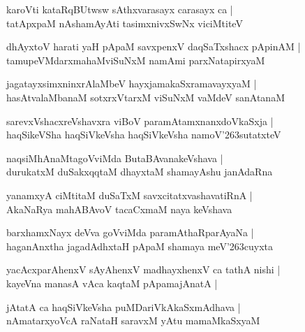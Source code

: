 \documentclass[twoside,12pt,openright]{book}
\def\S{\char'263}
\newcounter{shloka}[chapter]
\begin{document}
\begin{shloka}%
karoVti kataRqBUtwsw sAthxvarasayx carasayx ca |\\
tatApxpaM nAshamAyAti tasimxnivxSwNx viciMtiteV 
\end{shloka}

\begin{shloka}%
dhAyxtoV harati yaH pApaM savxpenxV daqSaTxshacx pApinAM |\\
tamupeVMdarxmahaMviSuNxM namAmi parxNatapirxyaM 
\end{shloka}

\begin{shloka}%
jagatayxsimxninxrAlaMbeV hayxjamakaSxramavayxyaM |\\
hasAtvalaMbanaM sotxrxVtarxM viSuNxM vaMdeV sanAtanaM 
\end{shloka}

\begin{shloka}%
sarevxVshacxreVshavxra viBoV paramAtamxnanxdoVkaSxja |\\
haqSikeVSha haqSiVkeVsha haqSiVkeVsha namoV\S sutatxteV 
\end{shloka}

\begin{shloka}%
naqsiMhAnaMtagoVviMda ButaBAvanakeVshava |\\
durukatxM duSakxqqtaM dhayxtaM shamayAshu janAdaRna  
\end{shloka}

\begin{shloka}%
yanamxyA ciMtitaM duSaTxM savxcitatxvashavatiRnA |\\
AkaNaRya mahABAvoV tacaCxmaM naya keVshava 
\end{shloka}

\begin{shloka}%
barxhamxNayx deVva goVviMda paramAthaRparAyaNa |\\
haganAnxtha jagadAdhxtaH pApaM shamaya meV\S cuyxta
\end{shloka}

\begin{shloka}%
yacAcxparAhenxV sAyAhenxV madhayxhenxV ca tathA nishi |\\
kayeVna manasA vAca kaqtaM pApamajAnatA |\\
\end{shloka}

\begin{shloka}%
jAtatA ca haqSiVkeVsha puMDariVkAkaSxmAdhava |\\
nAmatarxyoVcA raNataH  saravxM yAtu mamaMkaSxyaM
\end{shloka}
\end{document}
